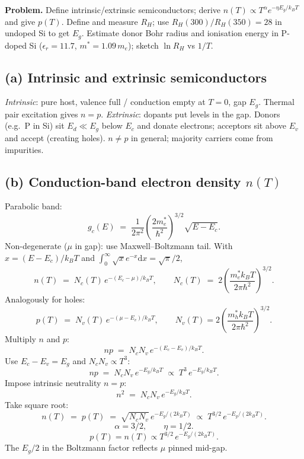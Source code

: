 \documentclass[11pt]{article}
\newcommand{\de}{\mathrm{d}}
\begin{document}
\textbf{Problem.} Define intrinsic/extrinsic semiconductors; derive $n(T)\propto T^\alpha e^{-\eta E_g/k_BT}$ and give $p(T)$. Define and measure $R_H$; use $R_H(300)/R_H(350)=28$ in undoped Si to get $E_g$. Estimate donor Bohr radius and ionisation energy in P-doped Si ($\epsilon_r=11.7$, $m^*=1.09\,m_e$); sketch $\ln R_H$ vs $1/T$.

\subsection*{(a) Intrinsic and extrinsic semiconductors}

\emph{Intrinsic}: pure host, valence full / conduction empty at $T=0$, gap $E_g$. Thermal pair excitation gives $n=p$. \emph{Extrinsic}: dopants put levels in the gap. Donors (e.g.\ P in Si) sit $E_d\ll E_g$ below $E_c$ and donate electrons; acceptors sit above $E_v$ and accept (creating holes). $n\neq p$ in general; majority carriers come from impurities.

\subsection*{(b) Conduction-band electron density $n(T)$}

Parabolic band:
\begin{equation}
g_c(E) \;=\; \frac{1}{2\pi^{2}}\!\left(\frac{2 m_e^{*}}{\hbar^{2}}\right)^{3/2}\sqrt{E - E_c}.
\label{eq:gc}
\end{equation}
Non-degenerate ($\mu$ in gap): use Maxwell--Boltzmann tail. With $x=(E-E_c)/k_BT$ and $\int_0^\infty\sqrt x e^{-x}\de x=\sqrt\pi/2$,
\begin{equation}
n(T) \;=\; N_c(T)\,e^{-(E_c-\mu)/k_B T},\qquad N_c(T) \;=\; 2\!\left(\frac{m_e^{*} k_B T}{2\pi\hbar^{2}}\right)^{3/2}.
\label{eq:nNc}
\end{equation}
Analogously for holes:
\begin{equation}
p(T) \;=\; N_v(T)\,e^{-(\mu-E_v)/k_B T},\qquad N_v(T)=2\!\left(\frac{m_h^{*} k_B T}{2\pi\hbar^{2}}\right)^{3/2}.
\label{eq:pNv}
\end{equation}
Multiply $n$ and $p$:
\[
np \;=\; N_c N_v\,e^{-(E_c-E_v)/k_BT}.
\]
Use $E_c - E_v = E_g$ and $N_c N_v \propto T^3$:
\[
np \;=\; N_c N_v\,e^{-E_g/k_BT} \;\propto\; T^3\,e^{-E_g/k_BT}.
\]
Impose intrinsic neutrality $n=p$:
\[
n^2 \;=\; N_c N_v\,e^{-E_g/k_BT}.
\]
Take square root:
\[
n(T) \;=\; p(T) \;=\; \sqrt{N_c N_v}\,e^{-E_g/(2k_BT)} \;\propto\; T^{3/2}\,e^{-E_g/(2k_BT)}.
\]
\begin{equation}
\boxed{\;\alpha = 3/2, \qquad \eta = 1/2.\;}
\label{eq:nbox}
\end{equation}
\begin{equation}
\boxed{\;p(T) = n(T) \propto T^{3/2}\,e^{-E_g/(2 k_B T)}.\;}
\label{eq:pbox}
\end{equation}
The $E_g/2$ in the Boltzmann factor reflects $\mu$ pinned mid-gap.
\end{document}

